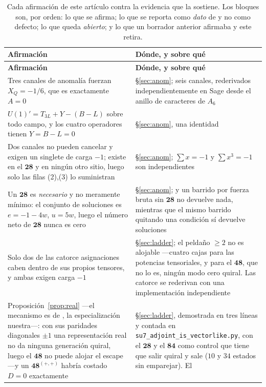 \documentclass[11pt,a4paper]{article}
\newcommand{\rep}[1]{\mathbf{#1}}
\begin{document}
\begingroup
\small
\begin{longtable}{p{}p{}}
\caption{Cada afirmación de este artículo contra la evidencia que la sostiene. Los bloques son, por
orden: lo que se afirma; lo que se reporta como \emph{dato} de \cite{KM25} y no como defecto; lo que
queda \emph{abierto}; y lo que un borrador anterior afirmaba y este retira.}\\
\toprule
\rowcolor{hdrblue!12}
\textbf{Afirmación} & \textbf{Dónde, y sobre qué}\\
\midrule
\endfirsthead
\toprule
\rowcolor{hdrblue!12}
\textbf{Afirmación} & \textbf{Dónde, y sobre qué}\\
\midrule
\endhead
Tres canales de anomalía fuerzan $X_Q=-1/6$, que es exactamente $A=0$ & \S\ref{sec:anom}; seis
canales, rederivados independientemente en Sage desde el anillo de caracteres de $A_6$\\
$U(1)'=T_{3L}+Y-(B-L)$ sobre todo campo, y los cuatro operadores tienen $Y=B-L=0$ &
\S\ref{sec:anom}, una identidad\\
Dos canales no pueden cancelar y exigen un singlete de carga $-1$; existe en el $\rep{28}$ y en
ningún otro sitio, luego solo las filas (2),(3) lo suministran & \S\ref{sec:anom}; $\sum x=-1$ y
$\sum x^3=-1$ son independientes\\
Un $\rep{28}$ es \emph{necesario} y no meramente mínimo: el conjunto de soluciones es $e=-1-4w$,
$u=5w$, luego el número neto de $\rep{28}$ nunca es cero & \S\ref{sec:anom}; y un barrido por fuerza
bruta sin $\rep{28}$ no devuelve nada, mientras que el mismo barrido quitando una condición sí
devuelve soluciones\\
Solo dos de las catorce asignaciones caben dentro de sus propios tensores, y ambas exigen carga
$-1$ & \S\ref{sec:ladder}; el peldaño $\ge2$ no es alojable ---cuatro cajas para las potencias
tensoriales, y para el $\rep{48}$, que no lo es, ningún modo cero quiral. Las catorce se
rederivan con una implementación independiente\\
\rowcolor{amber!12}Proposición~\ref{prop:real} ---el mecanismo es de \cite{GMN}, la especialización
nuestra---: con sus paridades diagonales $\pm1$ una representación real no da ninguna generación
quiral, luego el $\rep{48}$ no puede alojar el escape ---y un $\rep{48}^{(+,+)}$
habría costado $D=0$ exactamente & \S\ref{sec:ladder}, demostrada en tres líneas y contada en
\texttt{su7\_adjoint\_is\_vectorlike.py}, con el $\rep{28}$ y
el $\rep{84}$ como control que tiene que salir quiral y sale ($10$ y $34$ estados sin emparejar). El

\end{longtable}
\end{document}
